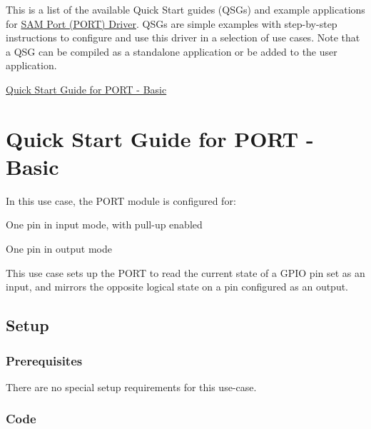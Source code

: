 This is a list of the available Quick Start guides (Q\+S\+Gs) and example applications for \hyperlink{group__asfdoc__sam0__port__group}{S\+A\+M Port (P\+O\+R\+T) Driver}. Q\+S\+Gs are simple examples with step-\/by-\/step instructions to configure and use this driver in a selection of use cases. Note that a Q\+S\+G can be compiled as a standalone application or be added to the user application.


\begin{DoxyItemize}
\item \hyperlink{asfdoc_sam0_port_basic_use_case}{Quick Start Guide for P\+O\+R\+T -\/ Basic} 
\end{DoxyItemize}\hypertarget{asfdoc_sam0_port_basic_use_case}{}\section{Quick Start Guide for P\+O\+R\+T -\/ Basic}\label{asfdoc_sam0_port_basic_use_case}
In this use case, the P\+O\+R\+T module is configured for\+: \begin{DoxyItemize}
\item One pin in input mode, with pull-\/up enabled \item One pin in output mode\end{DoxyItemize}
This use case sets up the P\+O\+R\+T to read the current state of a G\+P\+I\+O pin set as an input, and mirrors the opposite logical state on a pin configured as an output.\hypertarget{asfdoc_sam0_port_basic_use_case_asfdoc_sam0_port_basic_use_case_setup}{}\subsection{Setup}\label{asfdoc_sam0_port_basic_use_case_asfdoc_sam0_port_basic_use_case_setup}
\hypertarget{asfdoc_sam0_port_basic_use_case_asfdoc_sam0_port_basic_use_case_setup_prereq}{}\subsubsection{Prerequisites}\label{asfdoc_sam0_port_basic_use_case_asfdoc_sam0_port_basic_use_case_setup_prereq}
There are no special setup requirements for this use-\/case.\hypertarget{asfdoc_sam0_port_basic_use_case_asfdoc_sam0_port_basic_use_case_setup_code}{}\subsubsection{Code}\label{asfdoc_sam0_port_basic_use_case_asfdoc_sam0_port_basic_use_case_setup_code}
